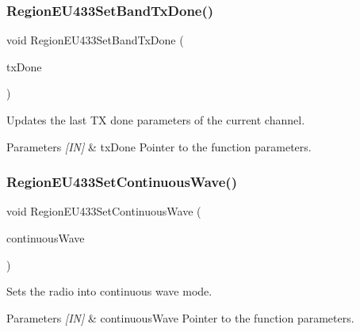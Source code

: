 \subsubsection{\texorpdfstring{Region\+E\+U433\+Set\+Band\+Tx\+Done()}{RegionEU433SetBandTxDone()}}
{\footnotesize\ttfamily void Region\+E\+U433\+Set\+Band\+Tx\+Done (\begin{DoxyParamCaption}\item[{\hyperlink{group__REGION_gad0524aa0673c0814a71e7a4f9cade3fc}{Set\+Band\+Tx\+Done\+Params\+\_\+t} $\ast$}]{tx\+Done }\end{DoxyParamCaption})}



Updates the last TX done parameters of the current channel. 


\begin{DoxyParams}{Parameters}
{\em \mbox{[}\+I\+N\mbox{]}} & tx\+Done Pointer to the function parameters. \\
\hline
\end{DoxyParams}
\mbox{\label{group__REGIONEU433_ga76561de6c45317a54ded972f7ac80836}} 
\subsubsection{\texorpdfstring{Region\+E\+U433\+Set\+Continuous\+Wave()}{RegionEU433SetContinuousWave()}}
{\footnotesize\ttfamily void Region\+E\+U433\+Set\+Continuous\+Wave (\begin{DoxyParamCaption}\item[{\hyperlink{group__REGION_gaf39bb5ba06921139c6d17f88a8d518cd}{Continuous\+Wave\+Params\+\_\+t} $\ast$}]{continuous\+Wave }\end{DoxyParamCaption})}



Sets the radio into continuous wave mode. 


\begin{DoxyParams}{Parameters}
{\em \mbox{[}\+I\+N\mbox{]}} & continuous\+Wave Pointer to the function parameters. \\
\hline
\end{DoxyParams}
\mbox{\label{group__REGIONEU433_ga29a68f1a72dfccfe89f01de36ddc542b}} 
